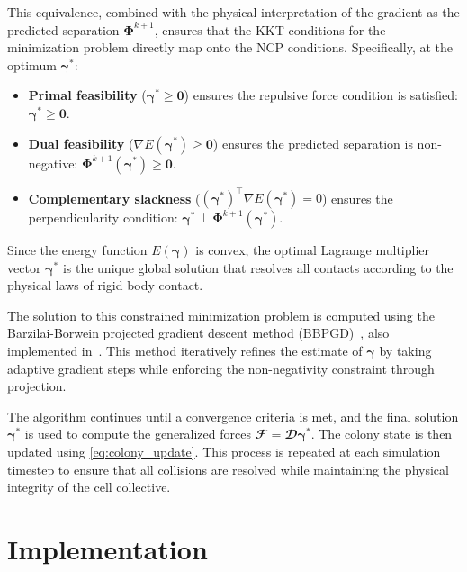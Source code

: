 \documentclass[conference]{IEEEtran}
\begin{document}
This equivalence, combined with the physical interpretation of the gradient as the predicted separation $\boldsymbol{\Phi}^{k+1}$, ensures that the KKT conditions for the minimization problem directly map onto the NCP conditions. Specifically, at the optimum $\boldsymbol{\gamma}^*$:

\begin{itemize}
    \item \textbf{Primal feasibility} ($\boldsymbol{\gamma}^* \ge \mathbf{0}$) ensures the repulsive force condition is satisfied: $\boldsymbol{\gamma}^* \ge \mathbf{0}$.
    \item \textbf{Dual feasibility} ($\nabla E(\boldsymbol{\gamma}^*) \ge \mathbf{0}$) ensures the predicted separation is non-negative: $\boldsymbol{\Phi}^{k+1}(\boldsymbol{\gamma}^*) \ge \mathbf{0}$.
    \item \textbf{Complementary slackness} ($(\boldsymbol{\gamma}^*)^\top \nabla E(\boldsymbol{\gamma}^*) = 0$) ensures the perpendicularity condition: $\boldsymbol{\gamma}^* \perp \boldsymbol{\Phi}^{k+1}(\boldsymbol{\gamma}^*)$.
\end{itemize}

Since the energy function $E(\boldsymbol{\gamma})$ is convex, the optimal Lagrange multiplier vector $\boldsymbol{\gamma}^*$ is the unique global solution that resolves all contacts according to the physical laws of rigid body contact.

The solution to this constrained minimization problem is computed using the Barzilai-Borwein projected gradient descent method (BBPGD)~\cite{BBPGD}, also implemented in~\cite{Weady2024}. This method iteratively refines the estimate of $\boldsymbol{\gamma}$ by taking adaptive gradient steps while enforcing the non-negativity constraint through projection.

The algorithm continues until a convergence criteria is met, and the final solution $\boldsymbol{\gamma}^*$ is used to compute the generalized forces $\mathbfcal{F} = \mathbfcal{D}\boldsymbol{\gamma}^*$. The colony state is then updated using \autoref{eq:colony_update}. This process is repeated at each simulation timestep to ensure that all collisions are resolved while maintaining the physical integrity of the cell collective.

\newpage

\section{Implementation}
\end{document}
